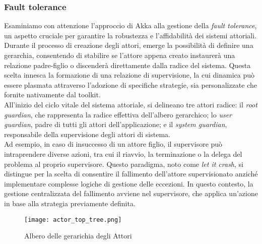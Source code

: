 \subsubsection[Fault tolerance]{Fault tolerance}
Esaminiamo con attenzione l'approccio di Akka alla gestione della \textit{fault tolerance}, un aspetto cruciale per garantire la robustezza e l'affidabilità dei sistemi attoriali.
Durante il processo di creazione degli attori, emerge la possibilità di definire una gerarchia, consentendo di stabilire se l'attore appena creato instaurerà una relazione padre-figlio o discenderà direttamente dalla radice del sistema.
Questa scelta innesca la formazione di una relazione di supervisione, la cui dinamica può essere plasmata attraverso l'adozione di specifiche strategie, sia personalizzate che fornite nativamente dal toolkit. \\
All'inizio del ciclo vitale del sistema attoriale, si delineano tre attori radice: il \textit{root guardian}, che rappresenta la radice effettiva dell'albero gerarchico; lo \textit{user guardian}, padre di tutti gli attori dell'applicazione; e il \textit{system guardian}, responsabile della supervisione degli attori di sistema. \\
Ad esempio, in caso di insuccesso di un attore figlio, il supervisore può intraprendere diverse azioni, tra cui il riavvio, la terminazione o la delega del problema al proprio supervisore.
Questo paradigma, noto come \textit{let it crash}, si distingue per la scelta di consentire il fallimento dell'attore supervisionato anziché implementare complesse logiche di gestione delle eccezioni.
In questo contesto, la gestione centralizzata del fallimento avviene nel supervisore, che applica un'azione in base alla strategia previamente definita.

\begin{figure}[H]
  \centering
  \texttt{[image: actor\_top\_tree.png]}
  \caption[Gerarichia degli Attori]{Albero delle gerarichia degli Attori}
\end{figure}

